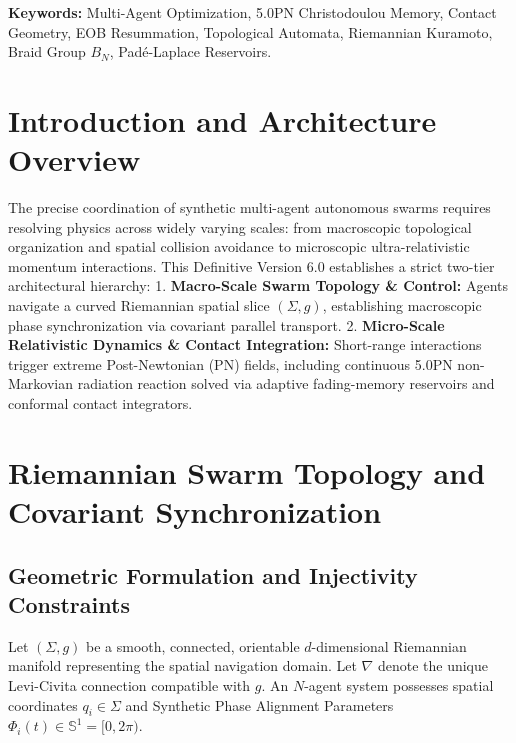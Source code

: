 \documentclass[11pt,a4paper,reqno]{article}
\theoremstyle{plain}
\theoremstyle{definition}
\theoremstyle{remark}
\numberwithin{equation}{section}
\begin{document}
\vspace{1ex}
\noindent \textbf{Keywords:} Multi-Agent Optimization, 5.0PN Christodoulou Memory, Contact Geometry, EOB Resummation, Topological Automata, Riemannian Kuramoto, Braid Group $B_N$, Padé-Laplace Reservoirs.

\newpage
\tableofcontents
\newpage

\section{Introduction and Architecture Overview}
The precise coordination of synthetic multi-agent autonomous swarms requires resolving physics across widely varying scales: from macroscopic topological organization and spatial collision avoidance to microscopic ultra-relativistic momentum interactions. This Definitive Version 6.0 establishes a strict two-tier architectural hierarchy:
1. \textbf{Macro-Scale Swarm Topology \& Control:} Agents navigate a curved Riemannian spatial slice $(\Sigma, g)$, establishing macroscopic phase synchronization via covariant parallel transport.
2. \textbf{Micro-Scale Relativistic Dynamics \& Contact Integration:} Short-range interactions trigger extreme Post-Newtonian (PN) fields, including continuous 5.0PN non-Markovian radiation reaction solved via adaptive fading-memory reservoirs and conformal contact integrators.

\bigskip

\section{Riemannian Swarm Topology and Covariant Synchronization}

\subsection{Geometric Formulation and Injectivity Constraints}
Let $(\Sigma, g)$ be a smooth, connected, orientable $d$-dimensional Riemannian manifold representing the spatial navigation domain. Let $\nabla$ denote the unique Levi-Civita connection compatible with $g$. An $N$-agent system possesses spatial coordinates $q_i \in \Sigma$ and Synthetic Phase Alignment Parameters $\Phi_i(t) \in \mathbb{S}^1 = [0, 2\pi)$.
\end{document}
